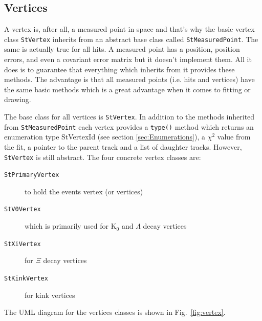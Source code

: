 \documentclass[twoside]{article}
\begin{document}
\subsection{Vertices}
\label{sec:vertices}
  
  

A vertex is, after all, a measured point in space and that's why the
basic vertex class \texttt{StVertex} inherits from an abstract base
class called \texttt{StMeasuredPoint}. The same is actually true for
all hits.  A measured point has a position, position errors, and even
a covariant error matrix but it doesn't implement them. All it does is
to guarantee that everything which inherits from it provides these
methods. The advantage is that all measured points (i.e. hits and
vertices) have the same basic methods which is a great advantage when
it comes to fitting or drawing.

The base class for all vertices is \texttt{StVertex}. In addition to
the methods inherited from \texttt{StMeasuredPoint} each vertex
provides a \texttt{type()} method which returns an enumeration type
StVertexId (see section \ref{sec:Enumerations}), a $\chi^2$ value from
the fit, a pointer to the parent track and a list of daughter tracks.
However, \texttt{StVertex} is still abstract. The four concrete vertex
classes are:
\begin{description}
\item[\texttt{StPrimaryVertex}] to hold the events vertex (or
    vertices)
\item[\texttt{StV0Vertex}] which is primarily used for K$_0$ and
    $\Lambda$ decay vertices
\item[\texttt{StXiVertex}] for $\Xi$ decay vertices
\item[\texttt{StKinkVertex}] for kink vertices
\end{description}
The UML diagram for the vertices classes is shown in
Fig.~\ref{fig:vertex}.
\end{document}
